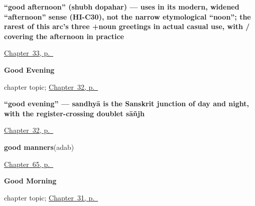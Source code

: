 \noindent\begin{minipage}[t]{\linewidth}
\raggedright
\textbf{\textquotedblleft{}good afternoon\textquotedblright{} (shubh dopahar) — uses  in its modern, widened \textquotedblleft{}afternoon\textquotedblright{} sense (HI-C30), not the narrow etymological \textquotedblleft{}noon\textquotedblright{}; the rarest of this arc's three +noun greetings in actual casual use, with / covering the afternoon in practice}\enspace\emph{ }\par
\footnotesize \hyperref[ch:hi-good-afternoon]{Chapter~33, p.~\pageref*{ch:hi-good-afternoon}}
\end{minipage}\par\smallskip

\noindent\begin{minipage}[t]{\linewidth}
\raggedright
\textbf{Good Evening}\par
\footnotesize chapter topic; \hyperref[ch:hi-good-evening]{Chapter~32, p.~\pageref*{ch:hi-good-evening}}
\end{minipage}\par\smallskip

\noindent\begin{minipage}[t]{\linewidth}
\raggedright
\textbf{\textquotedblleft{}good evening\textquotedblright{} — sandhyā is the Sanskrit junction of day and night, with the register-crossing doublet sāñjh}\enspace\emph{ }\par
\footnotesize \hyperref[ch:hi-good-evening]{Chapter~32, p.~\pageref*{ch:hi-good-evening}}
\end{minipage}\par\smallskip

\noindent\begin{minipage}[t]{\linewidth}
\raggedright
\textbf{good manners}\enspace\emph{}\enspace(adab)\par
\footnotesize \hyperref[ch:hi-asking-nicely]{Chapter~65, p.~\pageref*{ch:hi-asking-nicely}}
\end{minipage}\par\smallskip

\noindent\begin{minipage}[t]{\linewidth}
\raggedright
\textbf{Good Morning}\par
\footnotesize chapter topic; \hyperref[ch:hi-good-morning]{Chapter~31, p.~\pageref*{ch:hi-good-morning}}
\end{minipage}\par\smallskip

